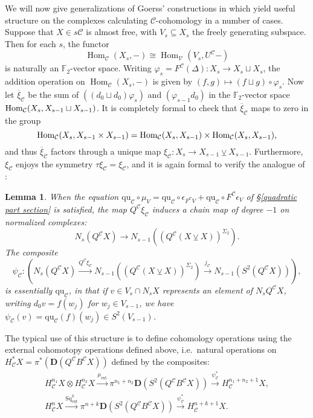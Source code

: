 \documentclass[11pt]{amsart} \renewcommand{\baselinestretch}{1.2}
\theoremstyle{plain}
\newtheorem{lem}[thm]{Lemma}
\numberwithin{equation}{section} %
\theoremstyle{plain}
\newtheorem{lem}[thm]{Lemma}
\numberwithin{equation}{chapter} %
\DeclareMathOperator{\Hom}{Hom}
\newcommand{\DASH}{\mathrm{-}}
\let\phi\varphi
\renewcommand{\to}{\longrightarrow}
\newcommand{\calV}{\mathcal{V}}
\newcommand{\calc}{\mathcal{C}}
\newcommand{\citeBOX}[2][]{\cite[\mbox{#1}]{#2}}
\newcommand{\vect}[2]{\calV^{#1}_{#2}}
\newcommand{\quadratic}{\mathrm{qu}}
\newcommand{\ExtCohOp}{\mathrm{Sq}_\mathrm{ext}}
\newcommand{\ExtCohProd}{\mu_\mathrm{ext}}
\newcommand{\F}{\mathbb{F}}
\newcommand{\Ftwo}{\F_2}
\newcommand{\dual}{\mathbf{D}}
\newcommand{\smashcoprod}{\veebar}%
\renewcommand{\mapsto}{\longmapsto}
\begin{document}
\begin{Constructing cohomology operations}
We will now give generalizations of Goerss' constructions in \citeBOX[\S5]{MR1089001}  which yield useful structure on the complexes calculating $\calc$-cohomology in a number of cases. Suppose that $X\in s\calc$ is almost free, with $V_s\subseteq X_s$ the freely generating subspace. Then for each $s$, the functor 
\[\Hom_\calc(X_s,\DASH)\cong \Hom_{\vect{}{}}(V_s,U^\calc\DASH)\]
is naturally an $\Ftwo $-vector space. Writing $\phi_s=F^\calc(\Delta):X_s\to X_s\sqcup X_s$, the addition operation on $\Hom_\calc(X_s,\DASH)$ is given by $(f,g)\mapsto (f\sqcup g)\circ\phi_s$. Now let
$\overline{\xi}_\calc$ be the sum of $((d_0\sqcup d_0)\phi_s)$ and $(\phi_{s-1}d_0)$ in the $\Ftwo $-vector space $\textup{Hom}_\calc(X_s,X_{s-1}\sqcup X_{s-1})$. It is completely formal to check that $\overline{\xi}_\calc$ maps to zero in the group
\[\textup{Hom}_\calc(X_s,X_{s-1}\times X_{s-1})=\textup{Hom}_\calc(X_s,X_{s-1})\times \textup{Hom}_\calc(X_s,X_{s-1}),\]
and thus $\overline{\xi}_\calc$ factors through a unique map $\xi_\calc:X_s\to X_{s-1}\smashcoprod X_{s-1}$. Furthermore, $\xi_\calc$ enjoys the symmetry $\tau\xi_\calc=\xi_\calc$, and it is again formal to verify the analogue of \cite[Lemma 5.5]{MR1089001}:
\begin{lem}
\label{psi is basically the quadratic part}
When the equation $\quadratic_\calc\circ\mu_V=\quadratic_\calc\circ \epsilon_{F^\calc V} +\quadratic_\calc\circ {F^\calc \epsilon_V}$ of \S\ref{quadratic part section} is satisfied, the map $Q^\calc\xi_\calc$ induces a chain map of degree $-1$ on normalized complexes:
\[N_s(Q^{\calc}X)\to N_{s-1}((Q^{\calc}(X\smashcoprod X))^{\Sigma_2}).\]
The composite
\[\psi_\calc:\left(N_s(Q^{\calc}X)\overset{Q^\calc\xi_\calc}{\to} N_{s-1}((Q^{\calc}(X\smashcoprod X))^{\Sigma_2})\overset{j_\calc}{\to} N_{s-1}(S^2(Q^{\calc}X))\right),\]
is essentially $\quadratic_\calc$, in that if $v\in V_s\cap N_sX$ represents an element of $N_sQ^\calc X$, writing $d_0v=f(w_j)$ for $w_j\in V_{s-1}$, we have $\psi_\calc(v)=\quadratic_\calc(f)(w_j)\in S^2(V_{s-1})$.
\end{lem}
The typical use of this structure is to define cohomology operations using the external cohomotopy operations defined above, i.e.\ natural operations on $H^*_\calc X=\pi^*(\dual(Q^\calc B^\calc X))$ defined by the composites:
\begin{gather*}
H_\calc^{n_1}X\otimes H_\calc^{n_2}X\overset{\ExtCohProd}{\to} \pi^{n_1+n_2}\dual(S^2(Q^\calc B^\calc X))\overset{\psi_\calc^*}{\to} H_\calc^{n_1+n_2+1}X,\\
H_\calc^{n}X\overset{\ExtCohOp^k}{\to} \pi^{n+k}\dual(S^2(Q^\calc B^\calc X))\overset{\psi_\calc^*}{\to} H_\calc^{n+k+1}X.

\end{gather*}
\end{Constructing cohomology operations}
\end{document}
